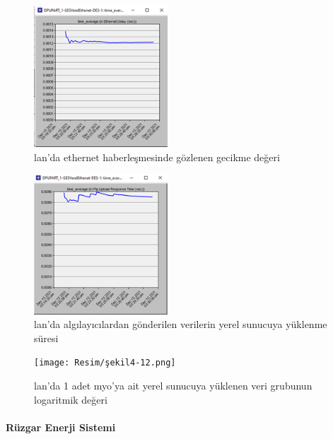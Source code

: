 \begin{figure}[htbp]
\centerline{\includegraphics[width=5cm]{Resim/sekil4-10.png}}
\caption{\gls{lan}'da ethernet haberleşmesinde gözlenen gecikme değeri}
\label{fig:4-10}
\end{figure}

\begin{figure}[htbp]
\centerline{\includegraphics[width=5cm]{Resim/sekil4-11.png}}
\caption{\gls{lan}'da algılayıcılardan gönderilen verilerin yerel sunucuya yüklenme süresi}
\label{fig:4-11}
\end{figure}

\begin{figure}[htbp]
\centerline{\texttt{[image: Resim/şekil4-12.png]}}
\caption{\gls{lan}'da 1 adet \gls{myo}'ya ait yerel sunucuya yüklenen veri grubunun logaritmik değeri}
\label{fig:4-12}
\end{figure}




\newpage


\paragraph{Rüzgar Enerji Sistemi}

